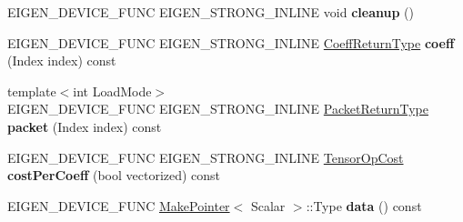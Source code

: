 \begin{DoxyCompactItemize}
E\+I\+G\+E\+N\+\_\+\+D\+E\+V\+I\+C\+E\+\_\+\+F\+U\+NC E\+I\+G\+E\+N\+\_\+\+S\+T\+R\+O\+N\+G\+\_\+\+I\+N\+L\+I\+NE void {\bfseries cleanup} ()
\item 
\mbox{\label{struct_eigen_1_1_tensor_evaluator_3_01const_01_tensor_forced_eval_op_3_01_arg_type_00_01_make_pointer___01_4_00_01_device_01_4_a336e5019f8310d609d84dd0a92af7e61}} 
E\+I\+G\+E\+N\+\_\+\+D\+E\+V\+I\+C\+E\+\_\+\+F\+U\+NC E\+I\+G\+E\+N\+\_\+\+S\+T\+R\+O\+N\+G\+\_\+\+I\+N\+L\+I\+NE \hyperlink{group___sparse_core___module}{Coeff\+Return\+Type} {\bfseries coeff} (Index index) const
\item 
\mbox{\label{struct_eigen_1_1_tensor_evaluator_3_01const_01_tensor_forced_eval_op_3_01_arg_type_00_01_make_pointer___01_4_00_01_device_01_4_a7fbd307eaf242b224d899add2cf85d06}} 
{\footnotesize template$<$int Load\+Mode$>$ }\\E\+I\+G\+E\+N\+\_\+\+D\+E\+V\+I\+C\+E\+\_\+\+F\+U\+NC E\+I\+G\+E\+N\+\_\+\+S\+T\+R\+O\+N\+G\+\_\+\+I\+N\+L\+I\+NE \hyperlink{group___sparse_core___module}{Packet\+Return\+Type} {\bfseries packet} (Index index) const
\item 
\mbox{\label{struct_eigen_1_1_tensor_evaluator_3_01const_01_tensor_forced_eval_op_3_01_arg_type_00_01_make_pointer___01_4_00_01_device_01_4_ad2af82826a94ff10dd8a78a9b00a84ba}} 
E\+I\+G\+E\+N\+\_\+\+D\+E\+V\+I\+C\+E\+\_\+\+F\+U\+NC E\+I\+G\+E\+N\+\_\+\+S\+T\+R\+O\+N\+G\+\_\+\+I\+N\+L\+I\+NE \hyperlink{class_eigen_1_1_tensor_op_cost}{Tensor\+Op\+Cost} {\bfseries cost\+Per\+Coeff} (bool vectorized) const
\item 
\mbox{\label{struct_eigen_1_1_tensor_evaluator_3_01const_01_tensor_forced_eval_op_3_01_arg_type_00_01_make_pointer___01_4_00_01_device_01_4_af7b6e52a48735e2bb85990c4f54b2c76}} 
E\+I\+G\+E\+N\+\_\+\+D\+E\+V\+I\+C\+E\+\_\+\+F\+U\+NC \hyperlink{struct_eigen_1_1_make_pointer}{Make\+Pointer}$<$ Scalar $>$\+::Type {\bfseries data} () const

\end{DoxyCompactItemize}
